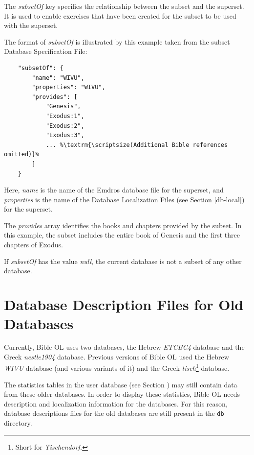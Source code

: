 \documentclass[11pt,oneside,a4paper]{memoir}
\begin{document}
The \emph{subsetOf} key specifies the relationship between the subset and the superset. It is used
to enable exercises that have been created for the subset to be used with the superset.

The format of \emph{subsetOf} is illustrated by this example taken from the subset Database
Specification File:

\begin{lstlisting}
    "subsetOf": {
        "name": "WIVU",
        "properties": "WIVU",
        "provides": [
            "Genesis",
            "Exodus:1",
            "Exodus:2",
            "Exodus:3",
            ... %\textrm{\scriptsize(Additional Bible references omitted)}%
        ]
    }
\end{lstlisting}

Here, \emph{name} is the name of the Emdros database file for the superset, and \emph{properties} is
the name of the Database Localization Files (see Section \ref{db-local}) for the superset.

The \emph{provides} array identifies the books and chapters provided by the subset. In this example,
the subset includes the entire book of Genesis and the first three chapters of Exodus.

If \emph{subsetOf} has the value \emph{null}, the current database is not a subset of any other
database.

\section{Database Description Files for Old Databases}\label{sec-old-db}

Currently, Bible OL uses two databases, the Hebrew \emph{ETCBC4} database and the Greek
\emph{nestle1904} database. Previous versions of Bible OL used the Hebrew \emph{WIVU} database (and
various variants of it) and the Greek \emph{tisch}\footnote{Short for \emph{Tischendorf.}} database.

The statistics tables in the user database (see Section \label{sec-statistics-tables}) may
still contain data from these older databases. In order to display these statistics, Bible OL needs
description and localization information for the databases. For this reason, database descriptions
files for the old databases are still present in the \texttt{db} directory.



\end{document}
